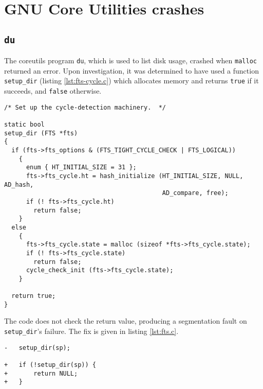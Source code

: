 \section{GNU Core Utilities crashes}
\subsection{\texttt{du}}
The coreutils program \texttt{du}, which is used to list disk usage, crashed when \texttt{malloc} returned an error. Upon investigation, it was determined to have used a function \texttt{setup\_dir} (listing \ref{lst:fts-cycle.c}) which allocates memory and returns \texttt{true} if it succeeds, and \texttt{false} otherwise.

\begin{lstlisting}[label={lst:fts-cycle.c},firstnumber=47, caption={\texttt{lib/fts-cycle.c}}]
/* Set up the cycle-detection machinery.  */

static bool
setup_dir (FTS *fts)
{
  if (fts->fts_options & (FTS_TIGHT_CYCLE_CHECK | FTS_LOGICAL))
    {
      enum { HT_INITIAL_SIZE = 31 };
      fts->fts_cycle.ht = hash_initialize (HT_INITIAL_SIZE, NULL, AD_hash,
                                           AD_compare, free);
      if (! fts->fts_cycle.ht)
        return false;
    }
  else
    {
      fts->fts_cycle.state = malloc (sizeof *fts->fts_cycle.state);
      if (! fts->fts_cycle.state)
        return false;
      cycle_check_init (fts->fts_cycle.state);
    }

  return true;
}
\end{lstlisting}

The code does not check the return value, producing a segmentation fault on \texttt{setup\_dir}'s failure.
 The fix is given in listing \ref{lst:fts.c}.
\lstset{numbers=left}
\begin{lstlisting}[label={lst:fts.c},firstnumber=986, caption={\texttt{lib/fts.c:986}}]
-	setup_dir(sp);

+	if (!setup_dir(sp)) {
+		return NULL;
+	}
\end{lstlisting}

\newpage

